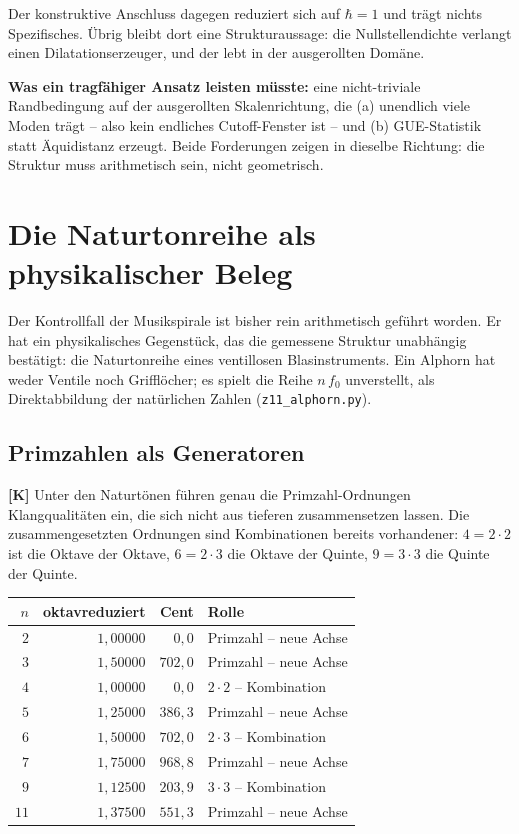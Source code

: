 Der konstruktive Anschluss dagegen reduziert sich auf $\hbar = 1$ und
tr\"agt nichts Spezifisches. \"Ubrig bleibt dort eine Strukturaussage:
die Nullstellendichte verlangt einen Dilatationserzeuger, und der lebt
in der ausgerollten Dom\"ane.

\textbf{Was ein tragf\"ahiger Ansatz leisten m\"usste:} eine
nicht-triviale Randbedingung auf der ausgerollten Skalenrichtung, die
(a) unendlich viele Moden tr\"agt -- also kein endliches
Cutoff-Fenster ist -- und (b) GUE-Statistik statt \"Aquidistanz erzeugt.
Beide Forderungen zeigen in dieselbe Richtung: die Struktur muss
arithmetisch sein, nicht geometrisch.

\section{Die Naturtonreihe als physikalischer Beleg}
\label{sec:alphorn}

Der Kontrollfall der Musikspirale ist bisher rein arithmetisch
gef\"uhrt worden. Er hat ein physikalisches Gegenst\"uck, das die
gemessene Struktur unabh\"angig best\"atigt: die Naturtonreihe eines
ventillosen Blasinstruments. Ein Alphorn hat weder Ventile noch
Grifflöcher; es spielt die Reihe $n\,f_0$ unverstellt, als
Direktabbildung der nat\"urlichen Zahlen
(\texttt{z11\_alphorn.py}).

\subsection{Primzahlen als Generatoren}

\textbf{[K]} Unter den Naturt\"onen f\"uhren genau die
Primzahl-Ordnungen Klangqualit\"aten ein, die sich nicht aus tieferen
zusammensetzen lassen. Die zusammengesetzten Ordnungen sind
Kombinationen bereits vorhandener: $4 = 2\cdot2$ ist die Oktave der
Oktave, $6 = 2\cdot3$ die Oktave der Quinte, $9 = 3\cdot3$ die Quinte
der Quinte.

\begin{center}
\begin{tabular}{rrrl}
\toprule
$n$ & oktavreduziert & Cent & Rolle \\
\midrule
$2$ & $1{,}00000$ & $0{,}0$ & Primzahl -- neue Achse \\
$3$ & $1{,}50000$ & $702{,}0$ & Primzahl -- neue Achse \\
$4$ & $1{,}00000$ & $0{,}0$ & $2\cdot2$ -- Kombination \\
$5$ & $1{,}25000$ & $386{,}3$ & Primzahl -- neue Achse \\
$6$ & $1{,}50000$ & $702{,}0$ & $2\cdot3$ -- Kombination \\
$7$ & $1{,}75000$ & $968{,}8$ & Primzahl -- neue Achse \\
$9$ & $1{,}12500$ & $203{,}9$ & $3\cdot3$ -- Kombination \\
$11$ & $1{,}37500$ & $551{,}3$ & Primzahl -- neue Achse \\
\bottomrule
\end{tabular}
\end{center}

